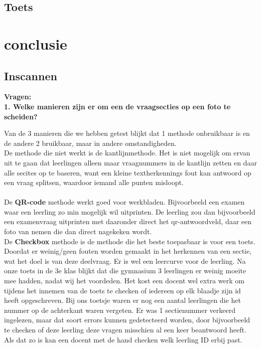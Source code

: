 \documentclass[12pt]{article}
\begin{document}
\pagebreak
\subsection{Toets}

\pagebreak
\section{conclusie}
\subsection{Inscannen}
\textbf{Vragen:}\\
\textbf{1. Welke manieren zijn er om een de vraagsecties op een foto te scheiden?} 
\begin{multicols}{2}
Van de 3 manieren die we hebben getest blijkt dat 1 methode onbruikbaar is en de andere 2 bruikbaar, maar in andere omstandigheden.\\
De methode die niet werkt is de kantlijnmethode. Het is niet mogelijk om ervan uit te gaan dat leerlingen alleen maar vraagnummers in de kantlijn zetten en daar alle secites op te baseren, want een kleine textherkennings fout kan antwoord op een vraag splitsen, waardoor iemand alle punten misloopt. \\
\\
De \textbf{QR-code} methode werkt goed voor werkbladen. Bijvoorbeeld een examen waar een leerling zo min mogelijk wil uitprinten. De leerling zou dan bijvoorbeeld een examenvraag uitprinten met daaronder direct het qr-antwoordveld, daar een foto van nemen die dan direct nagekeken wordt. 
\\
De \textbf{Checkbox} methode is de methode die het beste toepasbaar is voor een toets. Doordat er weinig/geen fouten worden gemaakt in het herkennen van een sectie, wat het doel is van deze deelvraag. Er is wel een leercurve voor de leerling. Na onze toets in de 3e klas blijkt dat die gymnasium 3 leerlingen er weinig moeite mee hadden, nadat wij het voordeden. Het kost een docent wel extra werk om tijdens het innemen van de toets te checken of iedereen op elk blaadje zijn id heeft opgeschreven. Bij ons toetsje waren er nog een aantal leerlingen die het nummer op de achterkant waren vergeten. Er was 1 sectienummer verkeerd ingelezen, maar dat soort errors kunnen gedetecteerd worden, door bijvoorbeeld te checken of deze leerling deze vragen misschien al een keer beantwoord heeft. Als dat zo is kan een docent met de hand checken welk leerling ID erbij past. 

\end{multicols}
\end{document}
